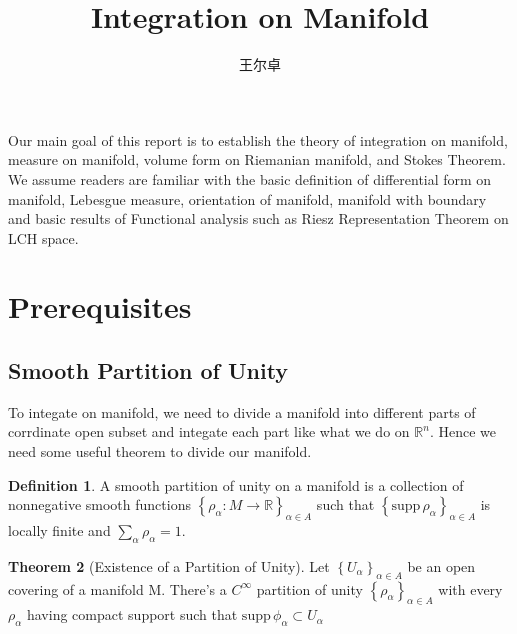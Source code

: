 \documentclass[b5paper,12pt]{article}
\title{Integration on Manifold}
\author{王尔卓}
\newcommand{\bbrace}[1]{\left\{ #1 \right\} }
\newcommand{\bb}[1]{\mathbb{#1}}
\theoremstyle{definition}
\newtheorem{defn}{Definition}[section]
\newtheorem{theo}[defn]{Theorem}
\begin{document}
\maketitle
Our main goal of this report is to establish the theory of integration on manifold, measure on manifold, volume form on Riemanian manifold, and Stokes Theorem. We assume readers are familiar with the basic definition of differential form on manifold,
Lebesgue measure, orientation of manifold, manifold with boundary
and basic results of Functional analysis such as Riesz Representation Theorem on LCH space.


\section{Prerequisites}
\subsection{Smooth Partition of Unity}
To integate on manifold, we need to divide a manifold into different parts of corrdinate open subset and integate each part like what we do on $\bb{R}^n$. Hence we need some useful theorem to divide our manifold.
\begin{defn}
    A smooth partition of unity on a manifold is a collection of nonnegative smooth functions $\bbrace{\rho_{\alpha}:M\rightarrow\bb{R}}_{\alpha\in A}$ such that $\bbrace{\text{supp}\,\rho_{\alpha}}_{\alpha\in A}$ is locally finite and $\sum_{\alpha}\rho_{\alpha}=1$.
\end{defn}
\begin{theo}[Existence of a Partition of Unity]
    Let $\bbrace{U_{\alpha}}_{\alpha\in A}$ be an open covering of a manifold M.
    There's a $C^{\infty}$ partition of unity $\bbrace{\rho_{\alpha}}_{\alpha\in A}$ with every $\rho_{\alpha}$ having compact support such that $\text{supp}\,\phi_{\alpha}\subset U_{\alpha}$
\end{theo}
\end{document}
